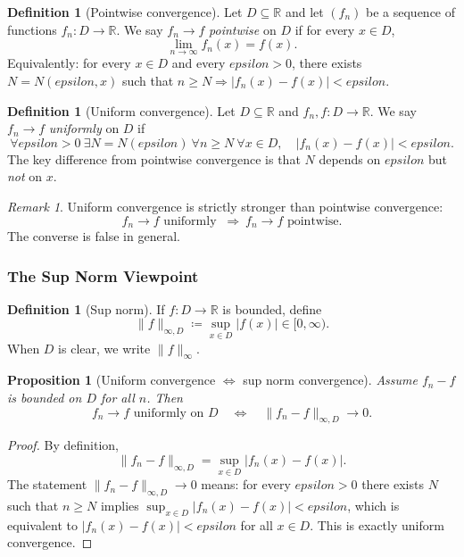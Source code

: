 \documentclass[12pt]{article}
\numberwithin{equation}{section}
\def\abs#1{|#1|}
\def\eps{epsilon}
\newcommand{\RR}{\mathbb{R}}
\DeclarePairedDelimiter{\abs}{\lvert}{\rvert}
\newcommand{\eps}{\varepsilon}               %
\theoremstyle{plain}
\newtheorem{proposition}[theorem]{Proposition}
\theoremstyle{definition}
\newtheorem{definition}[theorem]{Definition}
\theoremstyle{remark}
\newtheorem{remark}[theorem]{Remark}
\begin{document}
\begin{definition}[Pointwise convergence]\label{def:pointwise}
Let $D\subseteq\RR$ and let $(f_n)$ be a sequence of functions $f_n:D\to\RR$.
We say $f_n\to f$ \emph{pointwise} on $D$ if for every $x\in D$,
\[
\lim_{n\to\infty} f_n(x)=f(x).
\]
Equivalently: for every $x\in D$ and every $\eps>0$, there exists $N=N(\eps,x)$ such that
$n\ge N \Rightarrow \abs{f_n(x)-f(x)}<\eps$.
\end{definition}

\begin{definition}[Uniform convergence]\label{def:uniform}
Let $D\subseteq\RR$ and $f_n,f:D\to\RR$.
We say $f_n\to f$ \emph{uniformly} on $D$ if
\[
\forall \eps>0\ \exists N=N(\eps)\ \forall n\ge N\ \forall x\in D,\quad
\abs{f_n(x)-f(x)}<\eps.
\]
The key difference from pointwise convergence is that $N$ depends on $\eps$ but \emph{not} on $x$.
\end{definition}

\begin{remark}
Uniform convergence is strictly stronger than pointwise convergence:
\[
f_n\to f \text{ uniformly } \ \Rightarrow\ f_n\to f \text{ pointwise}.
\]
The converse is false in general.
\end{remark}

\subsubsection{The Sup Norm Viewpoint}

\begin{definition}[Sup norm]\label{def:supnorm}
If $f:D\to\RR$ is bounded, define
\[
\|f\|_{\infty,D}\coloneqq \sup_{x\in D}\abs{f(x)}\in[0,\infty).
\]
When $D$ is clear, we write $\|f\|_\infty$.
\end{definition}

\begin{proposition}[Uniform convergence $\Leftrightarrow$ sup norm convergence]\label{prop:uniform-sup}
Assume $f_n-f$ is bounded on $D$ for all $n$.
Then
\[
f_n\to f \text{ uniformly on }D
\quad\Longleftrightarrow\quad
\|f_n-f\|_{\infty,D}\to 0.
\]
\end{proposition}

\begin{proof}
By definition,
\[
\|f_n-f\|_{\infty,D}=\sup_{x\in D}\abs{f_n(x)-f(x)}.
\]
The statement $\|f_n-f\|_{\infty,D}\to 0$ means:
for every $\eps>0$ there exists $N$ such that $n\ge N$ implies
$\sup_{x\in D}\abs{f_n(x)-f(x)}<\eps$, which is equivalent to
$\abs{f_n(x)-f(x)}<\eps$ for all $x\in D$.
This is exactly uniform convergence.
\end{proof}
\end{document}
